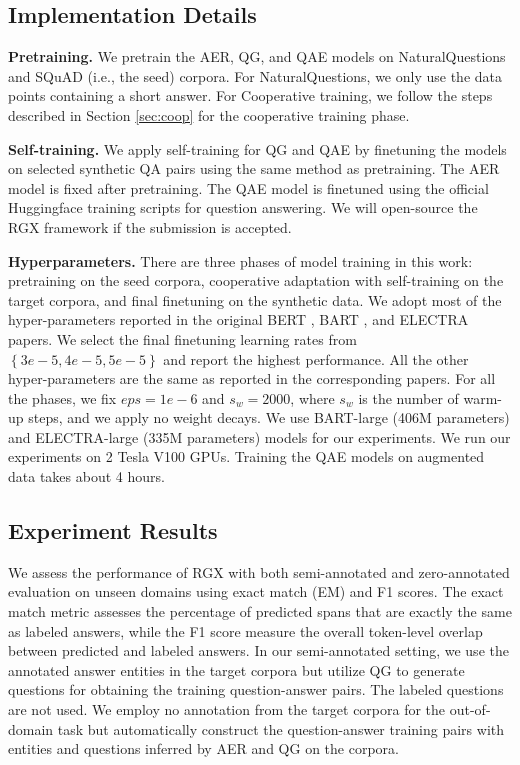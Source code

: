 \documentclass[11pt,a4paper]{article}
\begin{document}
\subsection{Implementation Details}


\noindent \textbf{Pretraining.}
We pretrain the AER, QG, and QAE models on NaturalQuestions and SQuAD (i.e., the seed) corpora. For NaturalQuestions, we only use the data points containing a short answer. For Cooperative training, we follow the steps described in Section \ref{sec:coop} for the cooperative training phase. 



\noindent \textbf{Self-training.}
We apply self-training for QG and QAE by finetuning the models on selected synthetic QA pairs using the same method as pretraining. The AER model is fixed after pretraining. The QAE model is finetuned using the official Huggingface \cite{wolf2019huggingface} training scripts for question answering. We will open-source the RGX framework if the submission is accepted. 

\noindent \textbf{Hyperparameters.} There are three phases of model training in this work: pretraining on the seed corpora, cooperative adaptation with self-training on the target corpora, and final finetuning on the synthetic data. We adopt most of the hyper-parameters reported in the original BERT \cite{devlin2018bert}, BART \cite{lewis2019bart}, and ELECTRA \cite{clark2019electra} papers.
We select the final finetuning learning rates from $\left \{ 3e-5, 4e-5, 5e-5 \right \}$ and report the highest performance. All the other hyper-parameters are the same as reported in the corresponding papers. For all the phases, we fix $eps=1e-6$ and $s_{w}=2000$, where $s_w$ is the number of warm-up steps, and we apply no weight decays. We use BART-large (406M parameters) and ELECTRA-large (335M parameters) models for our experiments. We run our experiments on 2 Tesla V100 GPUs. Training the QAE models on augmented data takes about 4 hours.

\subsection{Experiment Results}
We assess the performance of RGX with both semi-annotated and zero-annotated evaluation on unseen domains using exact match (EM) and F1 scores. The exact match metric assesses the percentage of predicted spans that are exactly the same as labeled answers, while the F1 score measure the overall token-level overlap between predicted and labeled answers. In our semi-annotated setting, we use the annotated answer entities in the target corpora but utilize QG to generate questions for obtaining the training question-answer pairs. The labeled questions are not used. We employ no annotation from the target corpora for the out-of-domain task but automatically construct the question-answer training pairs with entities and questions inferred by AER and QG on the corpora.
\end{document}
